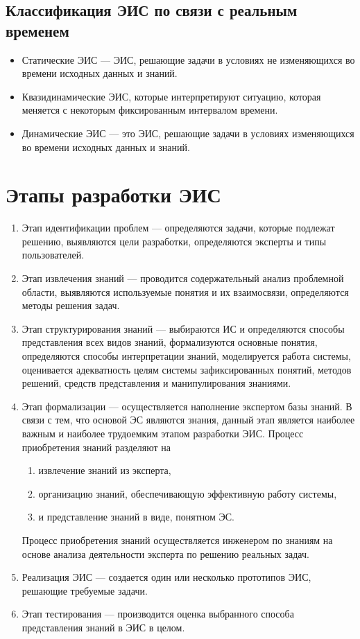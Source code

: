 \documentclass[a4paper,12pt,notitlepage,pdftex,headsepline]{scrartcl}
\begin{document}
  \subsection{Классификация ЭИС по связи с реальным временем}
    \begin{itemize}
      \item Статические ЭИС --- ЭИС, решающие задачи в условиях не
        изменяющихся во времени исходных данных и знаний.
      \item Квазидинамические ЭИС, которые интерпретируют ситуацию, которая
        меняется с некоторым фиксированным интервалом времени.
      \item Динамические ЭИС --- это ЭИС, решающие задачи в условиях
        изменяющихся во времени исходных данных и знаний.
    \end{itemize}
  \clearpage

\section{Этапы разработки ЭИС}
  \begin{enumerate}
    \item Этап идентификации проблем --- определяются задачи, которые подлежат
      решению, выявляются цели разработки, определяются эксперты и типы
      пользователей.
    \item Этап извлечения знаний --- проводится содержательный анализ проблемной
      области, выявляются используемые понятия и их взаимосвязи, определяются
      методы решения задач.
    \item Этап структурирования знаний --- выбираются ИС и определяются
      способы представления всех видов знаний, формализуются основные понятия,
      определяются способы интерпретации знаний, моделируется работа системы,
      оценивается адекватность целям системы зафиксированных понятий, методов
      решений, средств представления и манипулирования знаниями.
    \item Этап формализации --- осуществляется наполнение экспертом базы
      знаний.
      В связи с тем, что основой ЭС являются знания, данный этап является
      наиболее важным и наиболее трудоемким этапом разработки ЭИС.
      Процесс приобретения знаний разделяют на
      \begin{enumerate}
        \item извлечение знаний из эксперта,
        \item организацию знаний, обеспечивающую эффективную работу системы,
        \item и представление знаний в виде, понятном ЭС.
      \end{enumerate}
      Процесс приобретения знаний осуществляется инженером по знаниям на
      основе анализа деятельности эксперта по решению реальных задач.
    \item Реализация ЭИС --- создается один или несколько прототипов ЭИС,
      решающие требуемые задачи.
    \item Этап тестирования --- производится оценка выбранного способа
      представления знаний в ЭИС в целом.
  \end{enumerate}
  \clearpage
\end{document}
